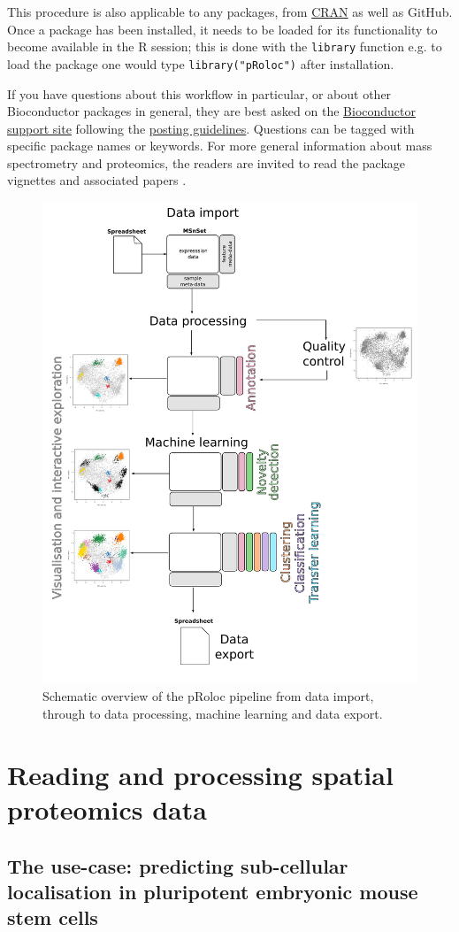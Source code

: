 This procedure is also applicable to any packages, from
\href{https://cran.r-project.org/}{CRAN} as well as GitHub. Once a
package has been installed, it needs to be loaded for its
functionality to become available in the R session; this is done with
the \texttt{library} function e.g.  to load the  package one
would type \texttt{library("pRoloc")} after installation.

If you have questions about this workflow in particular, or about
other Bioconductor packages in general, they are best asked on the
\href{https://support.bioconductor.org/}{Bioconductor support site}
following the
\href{http://www.bioconductor.org/help/support/posting-guide/}{posting
  guidelines}. Questions can be tagged with specific package names or
keywords. For more general information about mass spectrometry and
proteomics, the readers are invited to read the
 package vignettes and associated
papers \cite{Gatto:2014,Gatto:2015}.

\begin{figure}[!ht]
  \centering
  \includegraphics[width=.5\textwidth]{./Figures/overview.pdf}
  \caption{Schematic overview of the pRoloc pipeline from data import, through to data processing, machine learning and data export.}
  \label{fig:overview}
\end{figure}


\section*{Reading and processing spatial proteomics data}

\subsection*{The use-case: predicting sub-cellular localisation in pluripotent embryonic mouse stem cells}

